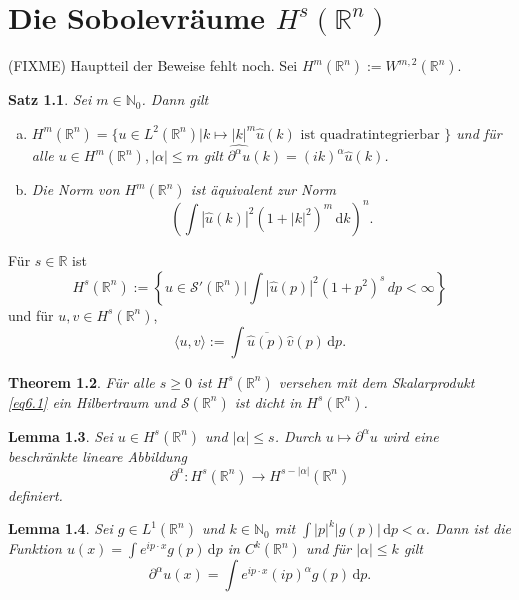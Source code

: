 \documentclass[
paper=a4,
bibtotocnumbered,
liststotocnumbered,
tablecaptionabove,
pointlessnumbers,
twoside,
openright,
10pt
]
{report}
\newtheorem{thm}{Theorem}[chapter]
\newtheorem{satz}[thm]{Satz}
\newtheorem{lem}[thm]{Lemma}
\theoremstyle{definition}
\numberwithin{equation}{chapter}
\begin{document}
\chapter{Die Sobolevräume $H^s(\mathbb R^n)$}
(FIXME) Hauptteil der Beweise fehlt noch.
Sei $H^m(\mathbb R^n) := W^{m,2}(\mathbb R^n)$.
\begin{satz}
Sei $m\in \mathbb N_0$. Dann gilt
\begin{enumerate}[(a)]
\item $H^m(\mathbb R^n) = \{ u\in L^2(\mathbb R^n)| k \mapsto |k|^m \hat u(k) \text{ ist quadratintegrierbar } \}$ und für alle $u\in H^m(\mathbb R^n), |\alpha|\le m$ gilt $\widehat{\partial^\alpha u} (k) = (ik)^\alpha \hat u(k)$.
\item Die Norm von $H^m(\mathbb R^n)$ ist äquivalent zur Norm
\begin{equation}
\left ( \int |\hat u(k)|^2 (1+|k|^2)^m \, \mathrm dk \right )^n.
\end{equation}
\end{enumerate}
\end{satz}
Für $s\in \mathbb R$ ist
\begin{equation}
H^s(\mathbb R^n):= \left \{ u \in \mathcal S'(\mathbb R^n) \bigg | \int |\hat u(p)|^2 (1+p^2)^s\, dp < \infty \right \}
\end{equation}
und für $u,v \in H^s(\mathbb R^n)$,
\begin{equation}\label{eq6.1}
\langle u,v\rangle := \int \overline{\hat u(p)} \hat v(p) \, \mathrm dp.
\end{equation}
\begin{thm}
Für alle $s\ge 0$ ist $H^s(\mathbb R^n)$ versehen mit dem Skalarprodukt \eqref{eq6.1} ein Hilbertraum und $\mathcal S(\mathbb R^n)$ ist dicht in $H^s(\mathbb R^n)$. 
\end{thm}
\begin{lem}
Sei $u\in H^s(\mathbb R^n)$ und $|\alpha|\le s$. Durch $u\mapsto \partial^\alpha u$ wird eine beschränkte lineare Abbildung
\begin{equation}
\partial^\alpha : H^s(\mathbb R^n) \to H^{s-|\alpha|} (\mathbb R^n)
\end{equation}
definiert.
\end{lem}

\begin{lem}
Sei $g\in L^1(\mathbb R^n)$ und $k\in \mathbb N_0$ mit $\int |p|^k |g(p)|\, \mathrm dp < \alpha$. Dann ist die Funktion $u(x) = \int e^{ip\cdot x} g(p) \, \mathrm dp$ in $C^k(\mathbb R^n)$ und für $|\alpha|\le k$ gilt
\begin{equation}
\partial^\alpha u(x) = \int e^{ip\cdot x} (ip)^\alpha g(p) \, \mathrm dp.
\end{equation}
\end{lem}
\end{document}
